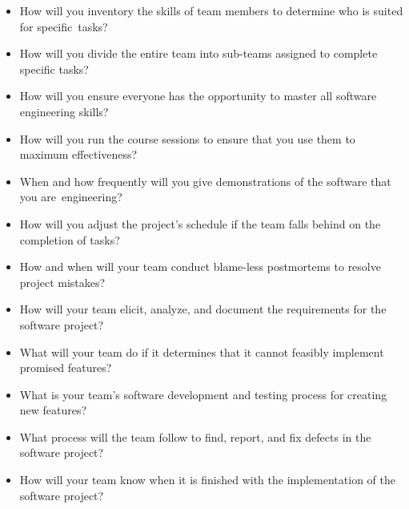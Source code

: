 \documentclass[11pt]{article}
\begin{document}
\begin{itemize}

  \setlength{\itemsep}{0pt}

\item How will you inventory the skills of team members to determine who is
  suited for \mbox{specific tasks}?

\item How will you divide the entire team into sub-teams assigned to complete
  specific tasks?

\item How will you ensure everyone has the opportunity to master all software
  engineering skills?

\item How will you run the course sessions to ensure that you use them
  to maximum effectiveness?

\item When and how frequently will you give demonstrations of the software that
  you \mbox{are engineering}?

\item How will you adjust the project's schedule if the team falls behind on the
  completion of tasks?

\item How and when will your team conduct blame-less postmortems to resolve
  project mistakes?

\item How will your team elicit, analyze, and document the requirements for the
  software project?

\item What will your team do if it determines that it cannot feasibly implement
  promised features?

\item What is your team's software development and testing process for creating
  new features?

\item What process will the team follow to find, report, and fix defects in the
  software project?

\item How will your team know when it is finished with the implementation of the
  software project?

\end{itemize}
\end{document}
